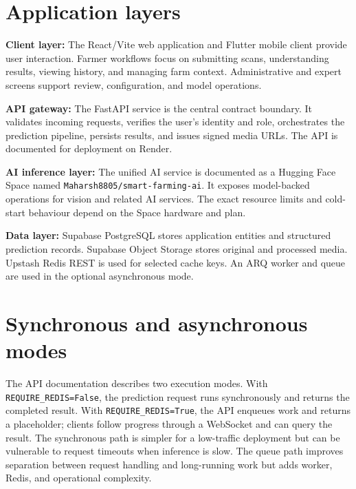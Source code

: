 \documentclass[12pt,a4paper,oneside,openany]{report}
\begin{document}
\section{Application layers}
\textbf{Client layer:} The React/Vite web application and Flutter mobile client provide user interaction. Farmer workflows focus on submitting scans, understanding results, viewing history, and managing farm context. Administrative and expert screens support review, configuration, and model operations.

\textbf{API gateway:} The FastAPI service is the central contract boundary. It validates incoming requests, verifies the user's identity and role, orchestrates the prediction pipeline, persists results, and issues signed media URLs. The API is documented for deployment on Render.

\textbf{AI inference layer:} The unified AI service is documented as a Hugging Face Space named \texttt{Maharsh8805/smart-farming-ai}. It exposes model-backed operations for vision and related AI services. The exact resource limits and cold-start behaviour depend on the Space hardware and plan.

\textbf{Data layer:} Supabase PostgreSQL stores application entities and structured prediction records. Supabase Object Storage stores original and processed media. Upstash Redis REST is used for selected cache keys. An ARQ worker and queue are used in the optional asynchronous mode.

\section{Synchronous and asynchronous modes}
The API documentation describes two execution modes. With \texttt{REQUIRE\_REDIS=False}, the prediction request runs synchronously and returns the completed result. With \texttt{REQUIRE\_REDIS=True}, the API enqueues work and returns a placeholder; clients follow progress through a WebSocket and can query the result. The synchronous path is simpler for a low-traffic deployment but can be vulnerable to request timeouts when inference is slow. The queue path improves separation between request handling and long-running work but adds worker, Redis, and operational complexity.
\end{document}
